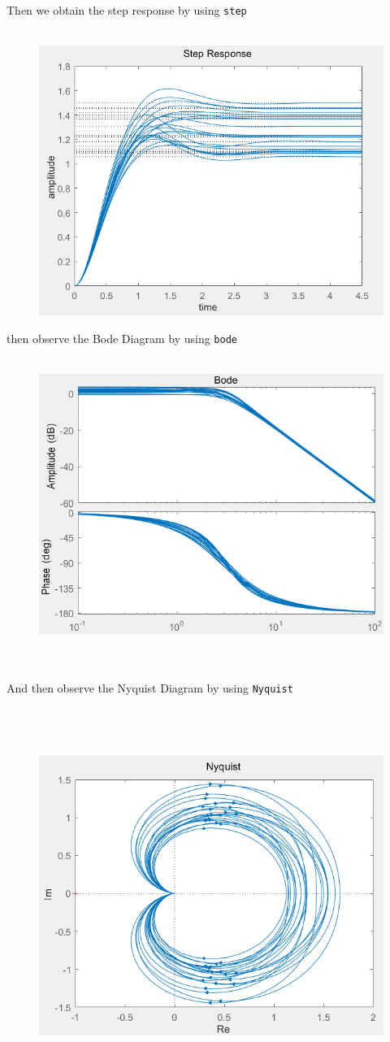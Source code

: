 \documentclass{article}
\begin{document}
Then we obtain the step response by using \verb|step|~\\~\\

\begin{figure}[h]
    \centering
    \includegraphics[width=0.5\linewidth]{1_3_step.png}
\end{figure}

then observe the Bode Diagram by using \verb|bode|~\\~\\

\begin{figure}[h]
    \centering
    \includegraphics[width=0.5\linewidth]{1_3_bode.png}
\end{figure}
~\\~\\

And then observe the Nyquist Diagram by using \verb|Nyquist|~\\~\\~\\~\\

\begin{figure}[t]
    \centering
    \includegraphics[width=0.5\linewidth]{1_3_nyquist.png}
\end{figure}
\end{document}
